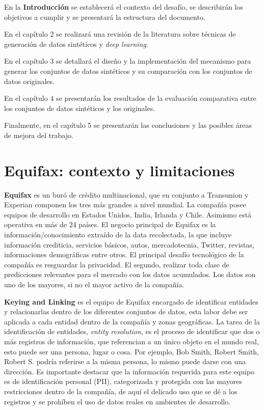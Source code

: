 En la \textbf{Introducción} se establecerá el contexto del desafío, se describirán los objetivos a cumplir y se presentará la estructura del documento.

En el capítulo 2 se realizará una revisión de la literatura sobre técnicas de generación de datos sintéticos y \emph{deep learning}.

En el capítulo 3 se detallará el diseño y la implementación del mecanismo para generar los conjuntos de datos sintéticos y su comparación con los conjuntos de datos originales.

En el capítulo 4 se presentarán los resultados de la evaluación comparativa entre los conjuntos de datos sintéticos y los originales.

Finalmente, en el capítulo 5 se presentarán las conclusiones y las posibles áreas de mejora del trabajo.

\newpage
\section{Equifax: contexto y limitaciones}

\textbf{Equifax} es un buró de crédito multinacional, que en conjunto a Transunion y Experian componen los tres más grandes a nivel mundial. La compañía posee equipos de desarrollo en Estados Unidos, India, Irlanda y Chile. Asimismo está operativa en más de 24 países. El negocio principal de Equifax es la información/conocimiento extraído de la data recolectada, la que incluye información crediticia, servicios básicos, autos, mercadotecnia, Twitter, revistas, informaciones demográficas entre otros. El principal desafío tecnológico de la compañía es resguardar la privacidad. El segundo, realizar toda clase de predicciones relevantes para el mercado con los datos acumulados. Los datos son uno de los mayores, si no el mayor activo de la compañía.

\textbf{Keying and Linking} es el equipo de Equifax encargado de identificar entidades y relacionarlas dentro de los diferentes conjuntos de datos, esta labor debe ser aplicada a cada entidad dentro de la compañía y zonas geográficas. La tarea de la identificación de entidades, \emph{entity resolution}, es el proceso de identificar que dos o más registros de información, que referencian a un único objeto en el mundo real, esto puede ser una persona, lugar o cosa. Por ejemplo, Bob Smith, Robert Smith, Robert S. podría referirse a la misma persona, lo mismo puede darse con una dirección. Es importante destacar que la información requerida para este equipo es de identificación personal (PII), categorizada y protegida con las mayores restricciones dentro de la compañía, de aquí el delicado uso que se dé a los registros y se prohíben el uso de datos reales en ambientes de desarrollo. 

